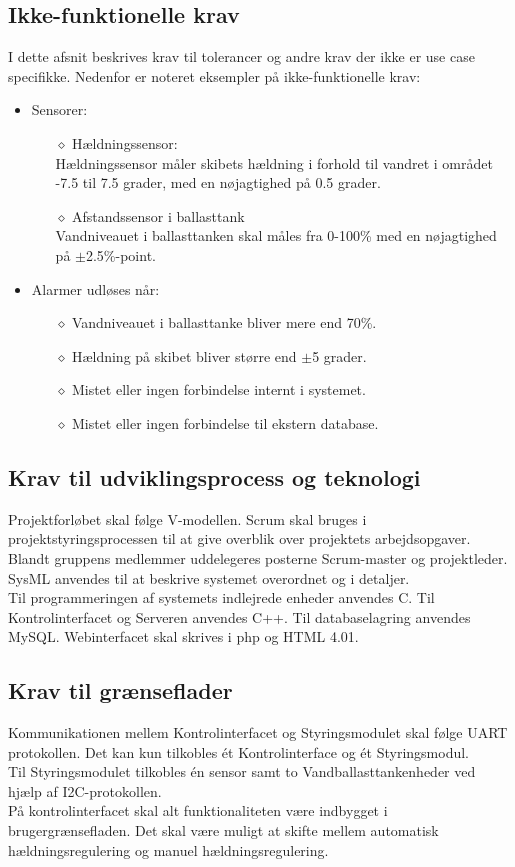 \subsection{Ikke-funktionelle krav}
I dette afsnit beskrives krav til tolerancer og andre krav der ikke er use case specifikke. Nedenfor er noteret eksempler på ikke-funktionelle krav:
\begin{itemize}
\item Sensorer:
\begin{itemize}
\item[$\diamond$] Hældningssensor:\\
Hældningssensor måler skibets hældning i forhold til vandret i området -7.5 til 7.5 grader, med en nøjagtighed på 0.5 grader.\\
\item[$\diamond$] Afstandssensor i ballasttank\\
Vandniveauet i ballasttanken skal måles fra 0-100\% med en nøjagtighed på $\pm$2.5\%-point.
\end{itemize}
\item Alarmer udløses når:
\begin{itemize}
\item[$\diamond$]Vandniveauet i ballasttanke bliver mere end 70\%.
\item[$\diamond$]Hældning på skibet bliver større end $\pm$5 grader.
\item[$\diamond$]Mistet eller ingen forbindelse internt i systemet.
\item[$\diamond$]Mistet eller ingen forbindelse til ekstern database.
\end{itemize}
\end{itemize}
\subsection{Krav til udviklingsprocess og teknologi}
Projektforløbet skal følge V-modellen. Scrum skal bruges i projektstyringsprocessen til at give overblik over projektets arbejdsopgaver. Blandt gruppens medlemmer uddelegeres posterne Scrum-master og projektleder.\\
SysML anvendes til at beskrive systemet overordnet og i detaljer.\\
Til programmeringen af systemets indlejrede enheder anvendes C. Til Kontrolinterfacet og Serveren anvendes C++. Til databaselagring anvendes MySQL. Webinterfacet skal skrives i php og HTML 4.01.

\subsection{Krav til grænseflader}
Kommunikationen mellem Kontrolinterfacet og Styringsmodulet skal følge UART protokollen. Det kan kun tilkobles ét Kontrolinterface og ét Styringsmodul.\\
Til Styringsmodulet tilkobles én sensor samt to Vandballasttankenheder ved hjælp af I2C-protokollen.\\
På kontrolinterfacet skal alt funktionaliteten være indbygget i brugergrænsefladen. Det skal være muligt at skifte mellem automatisk hældningsregulering og manuel hældningsregulering.\\

